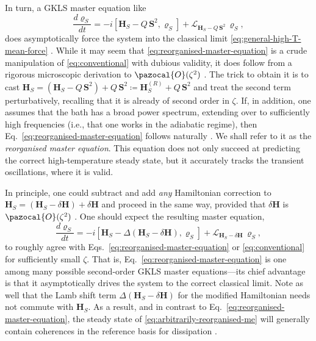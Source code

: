\documentclass[aps,pra,superscriptaddress,twocolumn,nofootinbib]{revtex4-2}
\begin{document}
In turn, a GKLS master equation like
\begin{equation}\label{eq:reorganised-master-equation}
    \frac{d\pmb{\varrho}_S}{dt} = -i[\pmb{H}_S-Q\,\pmb{S}^2,\pmb{\varrho}_S] + \mathcal{L}_{\pmb{H}_S-Q\,\pmb{S}^2}\,\pmb{\varrho}_S,
\end{equation}
does asymptotically force the system into the classical limit \eqref{eq:general-high-T-mean-force} \cite{winczewski2021}. While it may seem that \eqref{eq:reorganised-master-equation} is a crude manipulation of \eqref{eq:conventional} with dubious validity, it does follow from a rigorous microscopic derivation to $\pazocal{O}({\zeta^2})$ \cite{correa2023}. The trick to obtain it is to cast $ \pmb{H}_S = (\pmb{H}_S - Q\,\pmb{S}^2) + Q\,\pmb{S}^2 \coloneqq \pmb{H}_S^{(R)} + Q\,\pmb{S}^2 $ and treat the second term perturbatively, recalling that it is already of second order in $\zeta$. If, in addition, one assumes that the bath has a broad power spectrum, extending over to sufficiently high frequencies (i.e., that one works in the adiabatic regime), then Eq.~\eqref{eq:reorganised-master-equation} follows naturally \cite{correa2023}. We shall refer to it as the \textit{reorganised master equation}. This equation does not only succeed at predicting the correct high-temperature steady state, but it accurately tracks the transient oscillations, where it is valid. 

In principle, one could subtract and add \textit{any} Hamiltonian correction to $\pmb{H}_S = (\pmb{H}_S - \delta\pmb{H}) + \delta\pmb{H}$ and proceed in the same way, provided that $\delta\pmb{H}$ is $\pazocal{O}(\zeta^2)$ \cite{thingna2012,lobejko202,timofeev2022}. One should expect the resulting master equation, 
\begin{equation}\label{eq:arbitrarily-reorganised-me}
    \frac{d\pmb{\varrho}_S}{dt} = -i[\pmb{H}_S-\Delta(\pmb{H}_S-\delta\pmb{H}),\pmb{\varrho}_S] + \mathcal{L}_{\pmb{H}_S-\delta\pmb{H}}\,\pmb{\varrho}_S,
\end{equation}
to roughly agree with Eqs.~\eqref{eq:reorganised-master-equation} or \eqref{eq:conventional} for sufficiently small $\zeta$. That is, Eq.~\eqref{eq:reorganised-master-equation} is one among many possible second-order GKLS master equations---its chief advantage is that it asymptotically drives the system to the correct classical limit. Note as well that the Lamb shift term $\Delta(\pmb{H}_S-\delta\pmb{H})$ for the modified Hamiltonian needs not commute with $ \pmb{H}_S $. As a result, and in contrast to Eq.~\eqref{eq:reorganised-master-equation}, the steady state of \eqref{eq:arbitrarily-reorganised-me} will generally contain coherences in the reference basis for dissipation \cite{winczewski2021}.
\end{document}
